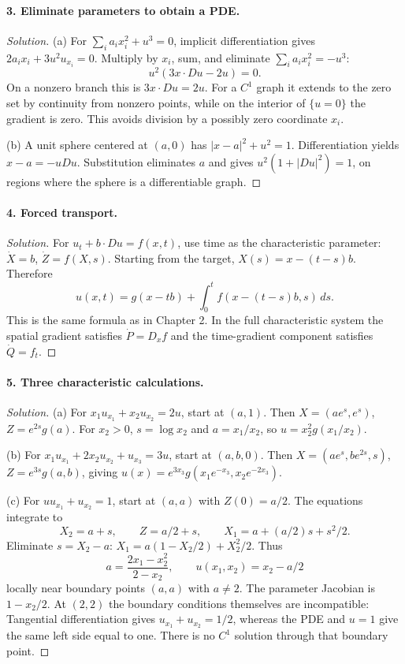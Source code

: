\Needspace{30mm}
\paragraph{3. Eliminate parameters to obtain a PDE.}
\begin{proof}[Solution]
(a) For $\sum_i a_ix_i^2+u^3=0$, implicit differentiation gives
$2a_ix_i+3u^2u_{x_i}=0$.
Multiply by $x_i$, sum, and eliminate $\sum_i a_ix_i^2=-u^3$:
\[
 u^2(3x\cdot Du-2u)=0.
\]
On a nonzero branch this is $3x\cdot Du=2u$.
For a $C^1$ graph it extends to the zero set by continuity from
nonzero points, while on the interior of $\{u=0\}$ the gradient is zero.
This avoids division by a possibly zero coordinate $x_i$.

(b) A unit sphere centered at $(a,0)$ has
$|x-a|^2+u^2=1$. Differentiation yields $x-a=-uDu$.
Substitution eliminates $a$ and gives $u^2(1+|Du|^2)=1$,
on regions where the sphere is a differentiable graph.
\end{proof}
\Needspace{45mm}

\Needspace{30mm}
\paragraph{4. Forced transport.}
\begin{proof}[Solution]
For $u_t+b\cdot Du=f(x,t)$, use time as the characteristic parameter:
$\dot X=b$, $\dot Z=f(X,s)$.
Starting from the target, $X(s)=x-(t-s)b$.
Therefore
\[
 u(x,t)=g(x-tb)+\int_0^tf(x-(t-s)b,s)\,ds.
\]
This is the same formula as in Chapter 2.
In the full characteristic system the spatial gradient satisfies
$\dot P=D_xf$ and the time-gradient component satisfies $\dot Q=f_t$.
\end{proof}

\Needspace{30mm}
\paragraph{5. Three characteristic calculations.}
\begin{proof}[Solution]
(a) For $x_1u_{x_1}+x_2u_{x_2}=2u$, start at $(a,1)$.
Then $X=(ae^s,e^s)$, $Z=e^{2s}g(a)$.
For $x_2>0$, $s=\log x_2$ and $a=x_1/x_2$, so
$u=x_2^2g(x_1/x_2)$.

(b) For $x_1u_{x_1}+2x_2u_{x_2}+u_{x_3}=3u$,
start at $(a,b,0)$.
Then $X=(ae^s,be^{2s},s)$, $Z=e^{3s}g(a,b)$, giving
$u(x)=e^{3x_3}g(x_1e^{-x_3},x_2e^{-2x_3})$.

(c) For $uu_{x_1}+u_{x_2}=1$, start at $(a,a)$ with $Z(0)=a/2$.
The equations integrate to
\[
 X_2=a+s,\qquad Z=a/2+s,\qquad X_1=a+(a/2)s+s^2/2.
\]
Eliminate $s=X_2-a$:
$X_1=a(1-X_2/2)+X_2^2/2$.
Thus
\[
 a=\frac{2x_1-x_2^2}{2-x_2},\qquad u(x_1,x_2)=x_2-a/2
\]
locally near boundary points $(a,a)$ with $a\ne2$.
The parameter Jacobian is $1-x_2/2$.
At $(2,2)$ the boundary conditions themselves are incompatible:
Tangential differentiation gives $u_{x_1}+u_{x_2}=1/2$,
whereas the PDE and $u=1$ give the same left side equal to one.
There is no $C^1$ solution through that boundary point.
\end{proof}

